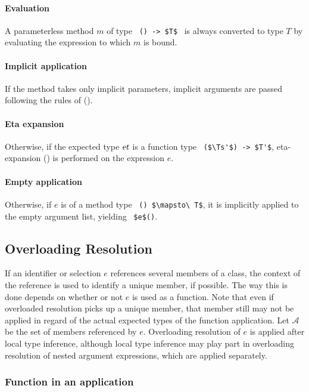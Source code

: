\paragraph{Evaluation}
A parameterless method $m$ of type ~\lstinline!() -> $T$!~ is always converted to type $T$ by evaluating the expression to which $m$ is bound. 

\paragraph{Implicit application}
If the method takes only implicit parameters, implicit arguments are passed following the rules of ().

\paragraph{Eta expansion}
Otherwise, if the expected type $\mbox{\sl et}$ is a function type ~\lstinline!($\Ts'$) -> $T'$!, eta-expansion () is performed on the expression $e$. 

\paragraph{Empty application}
Otherwise, if $e$ is of a method type ~\lstinline!() $\mapsto\ T$!, it is implicitly applied to the empty argument list, yielding ~\lstinline!$e$()!. 






\subsection{Overloading Resolution}
\label{sec:overloading-resolution}

If an identifier or selection $e$ references several members of a class, the context of the reference is used to identify a unique member, if possible. The way this is done depends on whether or not $e$ is used as a function. Note that even if overloaded resolution picks up a unique member, that member still may not be applied in regard of the actual expected types of the function application. Let $\mathcal{A}$ be the set of members referenced by $e$. Overloading resolution of $e$ is applied after local type inference, although local type inference may play part in overloading resolution of nested argument expressions, which are applied separately. 

\subsubsection{Function in an application}

